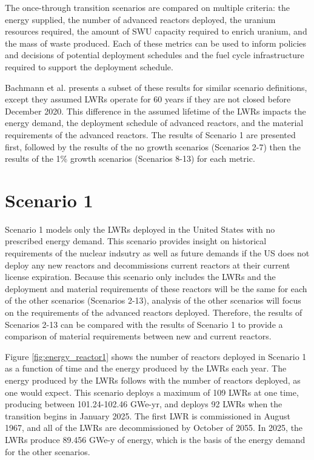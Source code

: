 The once-through transition scenarios are compared on multiple 
criteria: the energy supplied, the number of advanced reactors deployed, 
the uranium resources required, the amount of \gls{SWU} capacity required 
to enrich uranium,
and the mass of waste produced. Each of these metrics can be used to inform 
policies and decisions of potential deployment schedules and the 
fuel cycle infrastructure required to support the deployment schedule. 

Bachmann et al. \cite{bachmann_enrichment_2021} presents a subset of 
these results for similar scenario definitions, except they assumed 
\glspl{LWR} operate for 60 years if they are not closed before December 
2020. This difference in 
the assumed lifetime of the \glspl{LWR} impacts the energy demand, 
the deployment schedule of advanced reactors, and the material 
requirements of the advanced reactors. The results of Scenario 
1 are presented first, followed by the results of the no growth scenarios 
(Scenarios 2-7) then the results of the 1\% growth scenarios (Scenarios 8-13)
for each metric. 

\section{Scenario 1}
Scenario 1 models only the \glspl{LWR} deployed in the United States with no 
prescribed energy demand. This scenario provides insight on historical 
requirements of the nuclear indsutry as well as future demands if the 
US does not deploy any new reactors and decommissions current reactors at 
their current license expiration. 
Because this scenario only includes the \glspl{LWR} and the 
deployment and material requirements of these reactors will be the same 
for each of the other scenarios (Scenarios 2-13), analysis 
of the other scenarios will focus on the requirements of 
the advanced reactors deployed. Therefore, the results of Scenarios 2-13 can 
be compared with the results of Scenario 1 to provide a comparison 
of material requirements between new and current reactors. 

Figure \ref{fig:energy_reactor1} shows the number of 
reactors deployed in Scenario 1 as a function of time and the energy 
produced by the \glspl{LWR} each year. The energy produced by the 
\glspl{LWR} follows with the number of reactors deployed, as 
one would expect. This scenario deploys a maximum of 109 
\glspl{LWR} at one time, producing 
between 101.24-102.46 GWe-yr, and deploys 92 \glspl{LWR}
when the transition begins in January 2025. The first \gls{LWR} is 
commissioned in August 1967, and all of the \glspl{LWR} are
decommissioned by October of 2055. In 2025, the \glspl{LWR} produce 
89.456 GWe-y of energy, which is the basis of the energy demand for 
the other scenarios. 

